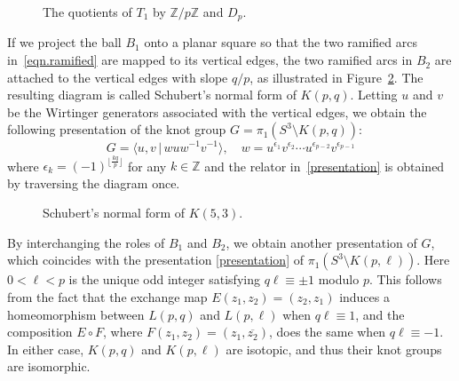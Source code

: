 \documentclass{amsart}
\newcommand{\Z}{\mathbb{Z}}
\theoremstyle{definition}
\begin{document}
\begin{figure}[htpb!]
    \centering
    
    \caption{The quotients of $T_1$ by $\Z/p \Z$ and $D_p$.}
    \label{fig.lens}
\end{figure}

If we project the ball $B_1$ onto a planar square so that the two ramified arcs in~\eqref{eqn.ramified} are mapped to its vertical edges, the two ramified arcs in $B_2$ are attached to the vertical edges with slope $q/p$, as illustrated in Figure~\ref{fig.schubert}. The resulting diagram is  called Schubert's normal form of $K(p,q)$. 
Letting $u$ and $v$ be the Wirtinger generators associated with the vertical edges, we obtain the following presentation of the knot group $G=\pi_1(S^3\setminus K(p,q))$:
\begin{equation}\label{presentation}
G=\langle u,v \, | \, wuw^{-1}v^{-1} \rangle, \quad w=u^{\epsilon_1}v^{\epsilon_2}\cdots u^{\epsilon_{p-2}} v^{\epsilon_{p-1}}
\end{equation}
where $\epsilon_k=(-1)^{\lfloor \frac{kq}{p}\rfloor}$ for any $k \in \Z$ and the relator in~\eqref{presentation} is obtained by traversing the diagram once.
\begin{figure}[htpb!]
    \centering
    
    \caption{Schubert's normal form of $K(5,3)$.}
    \label{fig.schubert}
\end{figure}

By interchanging the roles of $B_1$ and $B_2$, we obtain another presentation of $G$, which coincides with the presentation \eqref{presentation} of $\pi_1(S^3\setminus K(p,\ell))$. Here $0<\ell<p$ is the unique odd integer satisfying $q\ell \equiv \pm 1$ modulo $p$.
This follows from the fact that the exchange map $E(z_1,z_2)=(z_2,z_1)$ induces a homeomorphism between $L(p,q)$ and $L(p,\ell)$ when $q\ell \equiv 1$, and the composition $E\circ F$, where $F(z_1,z_2)=(z_1,\overline{z_2})$, does the same when $q\ell \equiv -1$. In either case, $K(p,q)$ and $K(p,\ell)$ are isotopic, and thus their knot groups are isomorphic.
 
\end{document}
